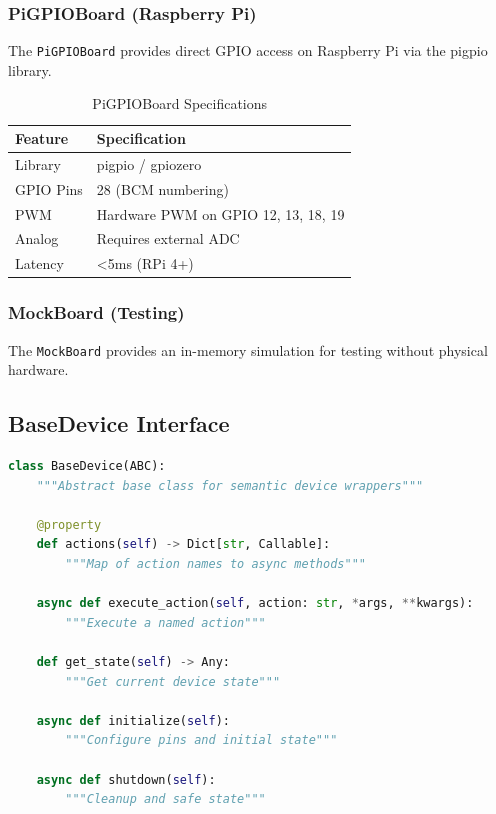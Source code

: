 \documentclass[11pt,a4paper]{article}
\begin{document}
\subsubsection{PiGPIOBoard (Raspberry Pi)}

The \texttt{PiGPIOBoard} provides direct GPIO access on Raspberry Pi via the pigpio library.

\begin{table}[H]
\centering
\begin{tabular}{@{}ll@{}}
\toprule
\textbf{Feature} & \textbf{Specification} \\
\midrule
Library & pigpio / gpiozero \\
GPIO Pins & 28 (BCM numbering) \\
PWM & Hardware PWM on GPIO 12, 13, 18, 19 \\
Analog & Requires external ADC \\
Latency & <5ms (RPi 4+) \\
\bottomrule
\end{tabular}
\caption{PiGPIOBoard Specifications}
\end{table}

\subsubsection{MockBoard (Testing)}

The \texttt{MockBoard} provides an in-memory simulation for testing without physical hardware.

\subsection{BaseDevice Interface}

\begin{lstlisting}[language=Python]
class BaseDevice(ABC):
    """Abstract base class for semantic device wrappers"""

    @property
    def actions(self) -> Dict[str, Callable]:
        """Map of action names to async methods"""

    async def execute_action(self, action: str, *args, **kwargs):
        """Execute a named action"""

    def get_state(self) -> Any:
        """Get current device state"""

    async def initialize(self):
        """Configure pins and initial state"""

    async def shutdown(self):
        """Cleanup and safe state"""
\end{lstlisting}
\end{document}
